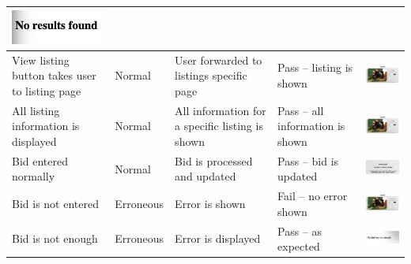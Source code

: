 \begin{center}
\begin{longtable}{|P{23mm}|P{20mm}|P{19mm}|P{20mm}|P{54mm}|}
\includegraphics[width=51mm]{ch4_testing_for_eval/media/image32.png} \\ \hline
View listing button takes user to listing page & Normal & User forwarded
to listings specific page & Pass -- listing is shown &
\includegraphics[width=51mm]{ch4_testing_for_eval/media/image33.png} \\ \hline
All listing information is displayed & Normal & All information for a
specific listing is shown & Pass -- all information is shown &
\includegraphics[width=51mm]{ch4_testing_for_eval/media/image33.png} \\ \hline
Bid entered normally & Normal & Bid is processed and updated & Pass --
bid is updated &
\includegraphics[width=51mm]{ch4_testing_for_eval/media/image34.png} \\ \hline
Bid is not entered & Erroneous & Error is shown & Fail -- no error shown
&
\includegraphics[width=51mm]{ch4_testing_for_eval/media/image33.png} \\ \hline
Bid is not enough & Erroneous & Error is displayed & Pass -- as expected
&
\includegraphics[width=51mm]{ch4_testing_for_eval/media/image35.png} \\ \hline

\end{longtable}
\end{center}

